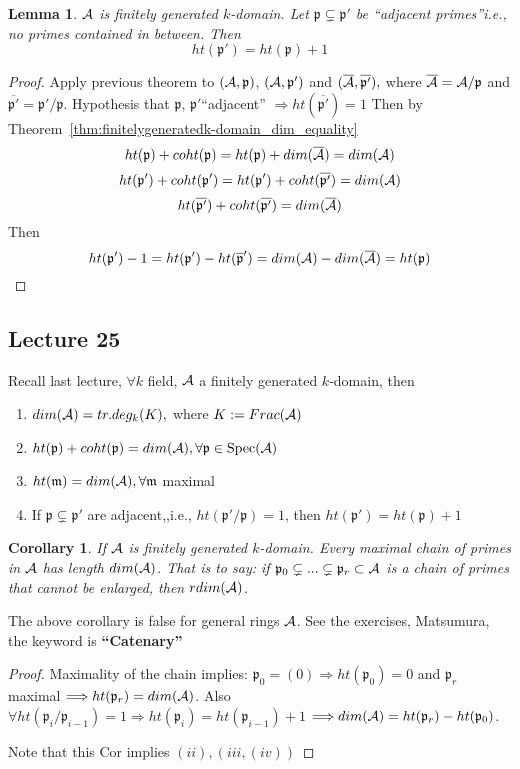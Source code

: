 \documentclass[11pt]{article}
\newtheorem{lemma}[thm]{Lemma}
\newtheorem{cor}[thm]{Corollary}
\newcommand{\scm}{{\mathfrak m}}
\newcommand{\scp}{{\mathfrak p}}
\newcommand{\cala}{{\cal A}}
\newcommand{\Lrta}{\Longrightarrow}
\begin{document}
\begin{lemma}
$\cala$ is finitely generated $k$-domain. Let $\scp\subsetneq \scp'$ be ``adjacent primes''i.e., no primes contained in between. Then 
$$
ht(\scp')=ht(\scp)+1
$$
\end{lemma}
\begin{proof}
Apply previous theorem to $(\cala,\scp)$, $(\cala,\scp')$ and $(\overline{\cala},\overline{\scp'}),$ where $\overline{\cala}=\cala/\scp$ and $\overline{\scp'}=\scp'/\scp$. Hypothesis that $\scp$, $\scp'$``adjacent'' $\Lrta ht(\overline{\scp'})=1$
Then by Theorem~\ref{thm:finitelygeneratedk-domain_dim_equality}
$$
ht(\scp)+coht(\scp)=ht(\scp)+dim(\overline{\cala})=dim(\cala)
$$
$$
ht(\scp')+coht(\scp')=ht(\scp')+coht(\overline{\scp'})=dim(\cala)
$$
$$
ht(\overline{\scp'})+coht(\overline{\scp'})=dim(\overline{\cala})
$$
Then
$$
ht(\scp')-1=ht(\scp')-ht(\overline{\scp}')=dim(\cala)-dim(\overline{\cala})=ht(\scp)
$$
\end{proof}

\subsection{Lecture 25}
Recall last lecture, $\forall k$ field, $\cala$ a finitely generated $k$-domain, then
\begin{enumerate}[label=(\roman*)]
\item $dim(\cala)=tr.deg_k(K),$ where $K:=Frac(\cala)$
\item $ht(\scp)+coht(\scp)=dim(\cala),\forall \scp\in \text{Spec}(\cala)$
\item $ht(\scm)=dim(\cala),\forall \scm$ maximal
\item If $\scp\subsetneq \scp'$ are adjacent,,i.e., $ht(\scp'/\scp)=1$, then $ht(\scp')=ht(\scp)+1$
\end{enumerate}

\begin{cor}
If $\cala$ is  finitely generated $k$-domain. Every maximal chain of primes in $\cala$ has length $dim(\cala)$. That is to say: if $\scp_0\subsetneq ...\subsetneq \scp_r\subset \cala$ is a chain of primes that cannot be enlarged, then $rdim(\cala)$.
\end{cor}
The above corollary is false for general rings $\cala$. See the exercises, Matsumura, the keyword is \textbf{``Catenary''}
\begin{proof}
Maximality of the chain implies: $\scp_0=(0)\Lrta ht(\scp_0)=0$ and $\scp_r$ maximal $\Lrta ht(\scp_r)=dim(\cala)$. Also $\forall ht(\scp_i/\scp_{i-1})=1\Lrta ht(\scp_i)=ht(\scp_{i-1})+1$ $\Lrta dim(\cala)=ht(\scp_r)-ht(\scp_0)$.

Note that this Cor implies $(ii),(iii,(iv))$
\end{proof} 
\end{document}
